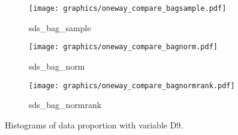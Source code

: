 \begin{figure}[H]
    \begin{subfigure}{0.32\textwidth}
        \centering
        \texttt{[image: graphics/oneway\_compare\_bagsample.pdf]}  
        \caption{sds\_bag\_sample}
        \label{subfig:bagsampleD9}
    \end{subfigure}
    \begin{subfigure}{0.32\textwidth}
        \centering
        \texttt{[image: graphics/oneway\_compare\_bagnorm.pdf]}  
        \caption{sds\_bag\_norm}
        \label{subfig:bagnormD9}
    \end{subfigure}
    \begin{subfigure}{0.32\textwidth}
        \centering
        \texttt{[image: graphics/oneway\_compare\_bagnormrank.pdf]}  
        \caption{sds\_bag\_normrank}
        \label{subfig:bagnormrankD9}
    \end{subfigure}
\caption{Histograms of data proportion with variable D9.}
\label{fig:D9-1}
\end{figure}

